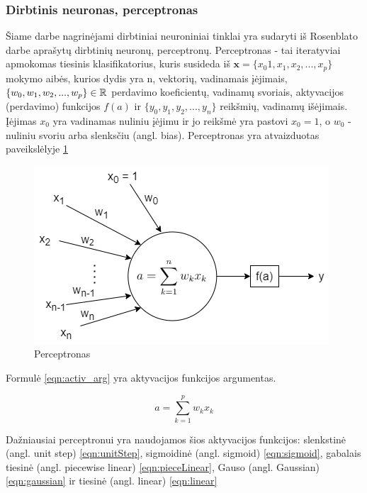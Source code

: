 \subsubsection{Dirbtinis neuronas, perceptronas}

Šiame darbe nagrinėjami dirbtiniai neuroniniai tinklai yra sudaryti iš Rosenblato darbe \cite{rosenPerc} aprašytų dirbtinių neuronų, perceptronų. Perceptronas -  tai iteratyviai apmokomas tiesinis klasifikatorius, kuris susideda iš $\boldsymbol{x} = \{x_{0}1, x_{1}, x_{2}, ..., x_{p}\}$ mokymo aibės, kurios dydis yra n, vektorių, vadinamais įėjimais, $\{w_{0}, w_{1}, w_{2}, ..., w_{p}\} \in \mathbb{R}$ perdavimo koeficientų, vadinamų svoriais, aktyvacijos (perdavimo) funkcijos $f(a)$ ir $\{y_{0}, y_{1}, y_{2}, ..., y_{n}\}$ reikšmių, vadinamų išėjimais. Įėjimas $x_{0}$ yra vadinamas nuliniu įėjimu ir jo reikšmė yra pastovi $x_{0} = 1$, o $w_{0}$ - nuliniu svoriu arba slenksčiu (angl. bias). Perceptronas yra atvaizduotas paveikslėlyje \ref{img:perceptron}

\begin{figure}[H]
	\centering
	\includegraphics[scale=0.5]{img/perceptron.png}
	\caption{Perceptronas}
	\label{img:perceptron}
\end{figure}

Formulė \ref{eqn:activ_arg} yra aktyvacijos funkcijos argumentas.

\begin{equation}
	\label{eqn:activ_arg}
	a = \sum_{k = 1}^{p} w_{k}x_k
\end{equation}

Dažniausiai perceptronui yra naudojamos šios aktyvacijos funkcijos: slenkstinė (angl. unit step) \ref{eqn:unitStep}, sigmoidinė (angl. sigmoid) \ref{eqn:sigmoid}, gabalais tiesinė (angl. piecewise linear) \ref{eqn:pieceLinear}, Gauso (angl. Gaussian) \ref{eqn:gaussian} ir tiesinė (angl. linear) \ref{eqn:linear}

